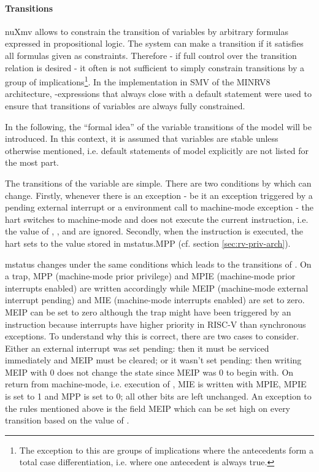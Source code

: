 \paragraph{Transitions}
nuXmv allows to constrain the transition of variables by arbitrary formulas expressed in propositional logic.
The system can make a transition if it satisfies all formulas given as constraints.
Therefore - if full control over the transition relation is desired - it often is not sufficient to simply constrain transitions by a group of implications\footnote{%
    The exception to this are groups of implications where the antecedents form a total case differentiation, i.e. where one antecedent is always true.
}.
In the implementation in SMV of the MINRV8 architecture, -expressions that always close with a default statement were used to ensure that transitions of variables are always fully constrained.

In the following, the \enquote{formal idea} of the variable transitions of the model will be introduced.
In this context, it is assumed that variables are stable unless otherwise mentioned, i.e. default statements of model explicitly are not listed for the most part.

The transitions of the  variable are simple.
There are two conditions by which  can change.
Firstly, whenever there is an exception - be it an exception triggered by a pending external interrupt or a environment call to machine-mode exception - the \gls{hart} switches to machine-mode and does not execute the current instruction, i.e. the value of , ,  and  are ignored.
Secondly, when the  instruction is executed, the \gls{hart} sets  to the value stored in \gls{mstatus}.MPP (cf. section \ref{sec:rv-priv-arch}).

\gls{mstatus} changes under the same conditions which leads to the transitions of .
On a trap, MPP (machine-mode prior privilege) and MPIE (machine-mode prior interrupts enabled) are written accordingly while MEIP (machine-mode external interrupt pending) and MIE (machine-mode interrupts enabled) are set to zero.
MEIP can be set to zero although the trap might have been triggered by an  instruction because interrupts have higher priority in RISC-V than synchronous exceptions.
To understand why this is correct, there are two cases to consider.
Either an external interrupt was set pending: then it must be serviced immediately and MEIP must be cleared; or it wasn't set pending: then writing MEIP with 0 does not change the state since MEIP was 0 to begin with.
On return from machine-mode, i.e. execution of , MIE is written with MPIE, MPIE is set to 1 and MPP is set to 0; all other bits are left unchanged.
An exception to the rules mentioned above is the field MEIP which can be set high on every transition based on the value of .


